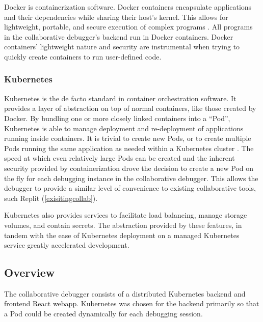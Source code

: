 \documentclass[12pt]{article}
\begin{document}
Docker is containerization software.  Docker containers encapsulate
applications and their dependencies while sharing their host's kernel.
This allows for lightweight, portable, and secure execution of complex
programs \cite{docker}.  All programs in the collaborative debugger's
backend run in Docker containers.  Docker containers' lightweight
nature and security are instrumental when trying to quickly create
containers to run user-defined code.

\subsubsection{Kubernetes}\label{k8s}

Kubernetes is the de facto standard in container orchestration
software.  It provides a layer of abstraction on top of normal
containers, like those created by Docker.  By bundling one or more
closely linked containers into a ``Pod'', Kubernetes is able to manage
deployment and re-deployment of applications running inside
containers.  It is trivial to create new Pods, or to create multiple
Pods running the same application as needed within a Kubernetes
cluster \cite{k8s}.  The speed at which even relatively large Pods can
be created and the inherent security provided by containerization
drove the decision to create a new Pod on the fly for each debugging
instance in the collaborative debugger.  This allows the debugger to
provide a similar level of convenience to existing collaborative
tools, such Replit (\ref{exisitingcollab}).
\par

Kubernetes also provides services to facilitate load balancing, manage
storage volumes, and contain secrets.  The abstraction provided by
these features, in tandem with the ease of Kubernetes deployment on a
managed Kubernetes service\cite{do_managed_k8s} greatly accelerated
development.

\subsection{Overview}

The collaborative debugger consists of a distributed Kubernetes
backend and frontend React webapp.  Kubernetes was chosen for the
backend primarily so that a Pod could be created dynamically for each
debugging session.  
\end{document}

